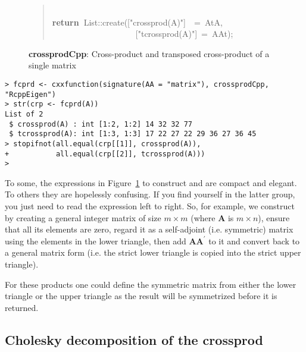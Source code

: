 \documentclass[shortnames,article]{jss}
\newcommand{\hlstd}[1]{\textcolor[rgb]{0,0,0}{#1}}
\newcommand{\hlopt}[1]{\textcolor[rgb]{0,0,0}{#1}}
\newcommand{\hlstr}[1]{\textcolor[rgb]{0.90,0.15,0.15}{#1}}
\newcommand{\hlkwa}[1]{\textcolor[rgb]{0.61,0.13,0.93}{\bf{#1}}}
\newcommand{\hlkwd}[1]{\textcolor[rgb]{0,0,0}{#1}}
\begin{document}
\begin{figure}[htb]
\begin{quote}
    \hlstd{}\hspace*{\fill}\\
    \hlkwa{return\ }\hlstd{List}\hlopt{::}\hlstd{}\hlkwd{create}\hlstd{}\hlopt{(}\hlstd{\textunderscore }\hlopt{{[}}\hlstd{}\hlstr{"crossprod(A)"}\hlstd{}\hlopt{{]}}\hlstd{\ \ }\hlopt{=\ }\hlstd{AtA}\hlopt{,}\hspace*{\fill}\\
    \hlstd{}\hlstd{\ \ \ \ \ \ \ \ \ \ \ \ \ \ \ \ \ \ \ \ }\hlstd{\textunderscore }\hlopt{{[}}\hlstd{}\hlstr{"tcrossprod(A)"}\hlstd{}\hlopt{{]}\ =\ }\hlstd{AAt}\hlopt{);}\hlstd{}\hspace*{\fill}
    \normalfont
    \normalsize
  \end{quote}
  \caption{\textbf{crossprodCpp}: Cross-product and transposed cross-product of a single matrix}
  \label{crossprod}
\end{figure}
\begin{verbatim}
> fcprd <- cxxfunction(signature(AA = "matrix"), crossprodCpp, "RcppEigen")
> str(crp <- fcprd(A))
List of 2
 $ crossprod(A) : int [1:2, 1:2] 14 32 32 77
 $ tcrossprod(A): int [1:3, 1:3] 17 22 27 22 29 36 27 36 45
> stopifnot(all.equal(crp[[1]], crossprod(A)),
+           all.equal(crp[[2]], tcrossprod(A)))
> 
\end{verbatim}

To some, the expressions in Figure~\ref{crossprod} to construct
 and  are compact and elegant.  To others they are
hopelessly confusing.  If you find yourself in the latter group, you
just need to read the expression left to right.  So, for example, we
construct  by creating a general integer matrix of size
$m\times m$ (where $\bm A$ is $m\times n$), ensure that all its
elements are zero, regard it as a self-adjoint (i.e. symmetric) matrix
using the elements in the lower triangle, then add $\bm A\bm A^\prime$
to it and convert back to a general matrix form (i.e. the strict lower
triangle is copied into the strict upper triangle).

For these products one could define the symmetric matrix from either
the lower triangle or the upper triangle as the result will be
symmetrized before it is returned.



\subsection{Cholesky decomposition of the crossprod}
\label{sec:chol}
\end{document}
